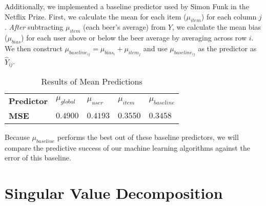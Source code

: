 \documentclass[12pt]{article}
\begin{document}
Additionally, we implemented a baseline predictor used by Simon Funk in the Netflix Prize.\textsuperscript{\cite{Funk}} First, we calculate the mean for each item ($\mu_{item}$) for each column $j$. \textit{After} subtracting $\mu_{item}$ (each beer's average) from $Y$, we calculate the mean bias ($\mu_{bias}$) for each user above or below the beer average by averaging across row $i$. We then construct ${\mu}_{baseline_{ij}} = \mu_{bias_i} + \mu_{item_j}$ and use $\mu_{baseline_{ij}}$ as the predictor as $\hat{Y}_{ij}$.


\begin{table}[ht!]
\centering
\caption{Results of Mean Predictions}
\vspace{2mm}
\begin{tabular}{lllll}
\hline
\textbf{Predictor}         & $\mu_{global}$ & $\mu_{user}$ & $\mu_{item}$ & $\mu_{baseline}$ \\ 
\textbf{MSE}              & $0.4900$       & $0.4193$     & $0.3550$     & $0.3458$         \\ \hline
\end{tabular}
\end{table}

Because ${\mu}_{baseline}$ performs the best out of these baseline predictors, we will compare the predictive success of our machine learning algorithms against the error of this baseline.

\section{Singular Value Decomposition}
\end{document}
